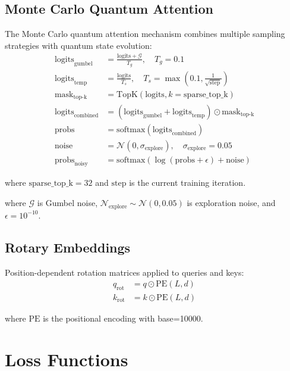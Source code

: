 \documentclass{article}
\begin{document}
\subsection{Monte Carlo Quantum Attention}
The Monte Carlo quantum attention mechanism combines multiple sampling strategies with quantum state evolution:
\begin{align*}
\text{logits}_{\text{gumbel}} &= \frac{\text{logits} + \mathcal{G}}{T_g}, \quad T_g = 0.1 \\
\text{logits}_{\text{temp}} &= \frac{\text{logits}}{T_s}, \quad T_s = \max(0.1, \frac{1}{\sqrt{\text{step}}}) \\
\text{mask}_{\text{top-k}} &= \text{TopK}(\text{logits}, k=\text{sparse\_top\_k}) \\
\text{logits}_{\text{combined}} &= (\text{logits}_{\text{gumbel}} + \text{logits}_{\text{temp}}) \odot \text{mask}_{\text{top-k}} \\
\text{probs} &= \text{softmax}(\text{logits}_{\text{combined}}) \\
\text{noise} &= \mathcal{N}(0, \sigma_{\text{explore}}), \quad \sigma_{\text{explore}} = 0.05 \\
\text{probs}_{\text{noisy}} &= \text{softmax}(\log(\text{probs} + \epsilon) + \text{noise})
\end{align*}

where $\text{sparse\_top\_k}=32$ and $\text{step}$ is the current training iteration.

where $\mathcal{G}$ is Gumbel noise, $\mathcal{N}_{\text{explore}} \sim \mathcal{N}(0, 0.05)$ is exploration noise, and $\epsilon=10^{-10}$.

\subsection{Rotary Embeddings}
Position-dependent rotation matrices applied to queries and keys:
\begin{equation}
\begin{split}
q_{\text{rot}} &= q \odot \text{PE}(L,d) \\
k_{\text{rot}} &= k \odot \text{PE}(L,d)
\end{split}
\end{equation}

where $\text{PE}$ is the positional encoding with base=10000.

\section{Loss Functions}
\end{document}
